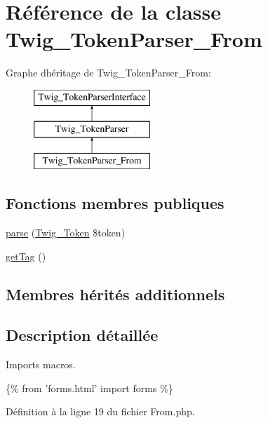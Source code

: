 \hypertarget{class_twig___token_parser___from}{}\section{Référence de la classe Twig\+\_\+\+Token\+Parser\+\_\+\+From}
\label{class_twig___token_parser___from}
Graphe d\textquotesingle{}héritage de Twig\+\_\+\+Token\+Parser\+\_\+\+From\+:\begin{figure}[H]
\begin{center}
\leavevmode
\includegraphics[height=3.000000cm]{class_twig___token_parser___from}
\end{center}
\end{figure}
\subsection*{Fonctions membres publiques}
\begin{DoxyCompactItemize}
\item 
\hyperlink{class_twig___token_parser___from_a5dfa2e269321584fb74e8b43dabe0efd}{parse} (\hyperlink{class_twig___token}{Twig\+\_\+\+Token} \$token)
\item 
\hyperlink{class_twig___token_parser___from_ab86ba36154b20e6bbfa3ba705f12f9d6}{get\+Tag} ()
\end{DoxyCompactItemize}
\subsection*{Membres hérités additionnels}


\subsection{Description détaillée}
Imports macros.


\begin{DoxyPre}
  \{\% from 'forms.html' import forms \%\}
\end{DoxyPre}
 

Définition à la ligne 19 du fichier From.\+php.



